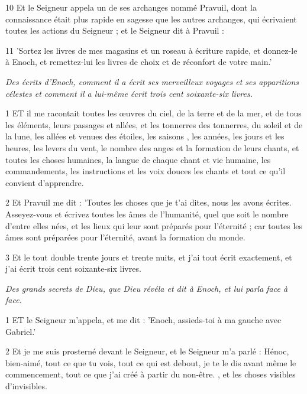 \par 10 Et le Seigneur appela un de ses archanges nommé Pravuil, dont la connaissance était plus rapide en sagesse que les autres archanges, qui écrivaient toutes les actions du Seigneur ; et le Seigneur dit à Pravuil :

\par 11 'Sortez les livres de mes magasins et un roseau à écriture rapide, et donnez-le à Enoch, et remettez-lui les livres de choix et de réconfort de votre main.'




\par \textit{Des écrits d'Enoch, comment il a écrit ses merveilleux voyages et ses apparitions célestes et comment il a lui-même écrit trois cent soixante-six livres.}

\par 1 ET il me racontait toutes les œuvres du ciel, de la terre et de la mer, et de tous les éléments, leurs passages et allées, et les tonnerres des tonnerres, du soleil et de la lune, les allées et venues des étoiles, les saisons , les années, les jours et les heures, les levers du vent, le nombre des anges et la formation de leurs chants, et toutes les choses humaines, la langue de chaque chant et vie humaine, les commandements, les instructions et les voix douces les chants et tout ce qu'il convient d'apprendre.

\par 2 Et Pravuil me dit : 'Toutes les choses que je t'ai dites, nous les avons écrites. Asseyez-vous et écrivez toutes les âmes de l’humanité, quel que soit le nombre d’entre elles nées, et les lieux qui leur sont préparés pour l’éternité ; car toutes les âmes sont préparées pour l'éternité, avant la formation du monde.

\par 3 Et le tout double trente jours et trente nuits, et j'ai tout écrit exactement, et j'ai écrit trois cent soixante-six livres.


\par \textit{Des grands secrets de Dieu, que Dieu révéla et dit à Enoch, et lui parla face à face.}

\par 1 ET le Seigneur m'appela, et me dit : 'Enoch, assieds-toi à ma gauche avec Gabriel.'

\par 2 Et je me suis prosterné devant le Seigneur, et le Seigneur m'a parlé : Hénoc, bien-aimé, tout ce que tu vois, tout ce qui est debout, je te le dis avant même le commencement, tout ce que j'ai créé à partir du non-être. , et les choses visibles d'invisibles.

